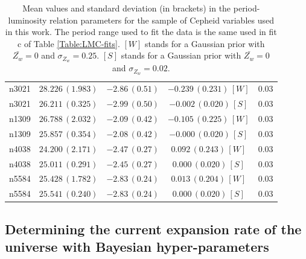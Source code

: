 \begin{table}[tbp]
\begin{tabular}{@{}ccccc}
 n3021 & $28.226\,(1.983)$ & $-2.86\,(0.51)$ & $-0.239\,(0.231)\,[W]$ & $0.03$ \\

 n3021 & $26.211\,(0.325)$ & $-2.99\,(0.50)$ & $-0.002\,(0.020)\,[S]$ & $0.03$ \\
  
 n1309 & $26.788\,(2.032)$ & $-2.09\,(0.42)$ & $-0.105\,(0.225)\,[W]$ & $0.03$ \\

 n1309 & $25.857\,(0.354)$ & $-2.08\,(0.42)$ & $-0.000\,(0.020)\,[S]$ & $0.03$ \\
   
 n4038 & $24.200\,(2.171)$ & $-2.47\,(0.27)$ & $0.092\,(0.243)\,[W]$ & $0.03$ \\

 n4038 & $25.011\,(0.291)$ & $-2.45\,(0.27)$ & $0.000\,(0.020)\,[S]$ & $0.03$ \\
    
 n5584 & $25.428\,(1.782)$ & $-2.83\,(0.24)$ & $0.013\,(0.204)\,[W]$ & $0.03$ \\   

 n5584 & $25.541\,(0.240)$ & $-2.83\,(0.24)$ & $0.000\,(0.020)\,[S]$ & $0.03$ \\   
 
\hline
\end{tabular}
\caption{\label{Table:Zw-dependence-of-PL-relation} Mean values and standard deviation (in brackets) in the period-luminosity relation parameters for the sample of Cepheid variables used in this work. The period range used to fit the data is the same used in fit c of Table \ref{Table:LMC-fits}. $[W]$ stands for a Gaussian prior with $\bar{Z_w}=0$ and $\sigma_{Z_w}=0.25$. $[S]$ stands for a Gaussian prior with $\bar{Z_w}=0$ and $\sigma_{Z_w}=0.02$.}
\end{table}




\subsection{Determining the current expansion rate of the universe with Bayesian hyper-parameters}
\label{Subsection:combining-anchors}

